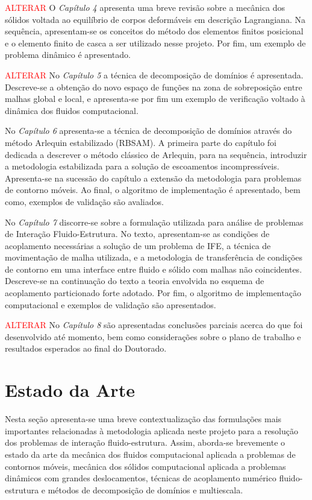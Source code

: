 \documentclass[tese_patricia.tex]{subfiles}
\begin{document}
\textcolor{red}{ALTERAR}
O \textit{Capítulo 4} apresenta uma breve revisão sobre a mecânica dos sólidos voltada ao equilíbrio de corpos deformáveis em descrição Lagrangiana.  Na sequência, apresentam-se os conceitos do método dos elementos finitos posicional e o elemento finito de casca a ser utilizado nesse projeto. Por fim, um exemplo de problema dinâmico é apresentado.

\textcolor{red}{ALTERAR}
No \textit{Capítulo 5} a técnica de decomposição de domínios é apresentada. Descreve-se a obtenção do novo espaço de funções na zona de sobreposição entre malhas global e local, e apresenta-se por fim um exemplo de verificação voltado à dinâmica dos fluidos computacional.

No \textit{Capítulo 6} apresenta-se a técnica de decomposição de domínios através do método Arlequin estabilizado (RBSAM). A primeira parte do capítulo foi dedicada a descrever o método clássico de Arlequin, para na sequência, introduzir a metodologia estabilizada para a solução de escoamentos incompressíveis. Apresenta-se na sucessão do capítulo a extensão da metodologia para problemas de contorno móveis. Ao final, o algoritmo de implementação é apresentado, bem como, exemplos de validação são avaliados.

No \textit{Capítulo 7} discorre-se sobre a formulação utilizada para análise de problemas de Interação Fluido-Estrutura. No texto, apresentam-se as condições de acoplamento necessárias a solução de um problema de IFE, a técnica de movimentação de malha utilizada, e a metodologia de transferência de condições de contorno em uma interface entre fluido e sólido com malhas não coincidentes. Descreve-se na continuação do texto a teoria envolvida no esquema de acoplamento particionado forte adotado. Por fim, o algoritmo de implementação computacional e exemplos de validação são apresentados.

\textcolor{red}{ALTERAR} No \textit{Capítulo 8} são apresentadas conclusões parciais acerca do que foi desenvolvido até momento, bem como considerações sobre o plano de trabalho e resultados esperados ao final do Doutorado.


\section[Estado da Arte]{Estado da Arte}\label{section:estado_da_arte}

Nesta seção apresenta-se uma breve contextualização das formulações mais importantes relacionadas à metodologia aplicada neste projeto para a resolução dos problemas de interação fluido-estrutura. Assim, aborda-se brevemente o estado da arte da mecânica dos fluidos computacional aplicada a problemas de contornos móveis, mecânica dos sólidos computacional aplicada a problemas dinâmicos com grandes deslocamentos, técnicas de acoplamento numérico fluido-estrutura e métodos de decomposição de domínios e multiescala.
\end{document}
